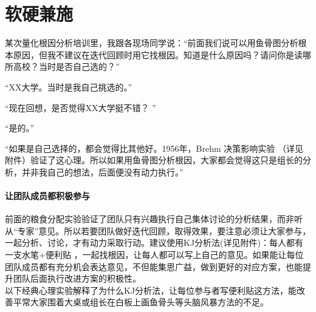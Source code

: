 \chapter{软硬兼施} %
某次量化根因分析培训里，我跟各现场同学说：“前面我们说可以用鱼骨图分析根本原因，但我不建议在迭代回顾时用它找根因。知道是什么原因吗？请问你是读哪所高校？当时是否自己选的？”

“XX大学。当时是我自己挑选的。”

“现在回想，是否觉得XX大学挺不错？ ”

“是的。”

“如果是自己选择的，都会觉得比其他好。1956年，Brehm 决策影响实验 （详见附件）验证了这心理。所以如果用鱼骨图分析根因，大家都会觉得这只是组长的分析，并非我自己的想法，后面便没有动力执行。”\\


\hypertarget{ux8ba9ux56e2ux961fux6210ux5458ux90fdux79efux6781ux53c2ux4e0e}{%
\subsubsection{让团队成员都积极参与}\label{ux8ba9ux56e2ux961fux6210ux5458ux90fdux79efux6781ux53c2ux4e0e}}

前面的粮食分配实验验证了团队只有兴趣执行自己集体讨论的分析结果，而非听从``专家''意见。所以若要团队做好迭代回顾，取得效果，要注意必须让大家参与，一起分析、讨论，才有动力采取行动。建议使用KJ分析法(详见附件)：每人都有一支水笔+便利贴
，一起找根因，让每人都可以写上自己的意见。如果能让每位团队成员都有充分机会表达意见，不但能集思广益，做到更好的对应方案，也能提升团队后面执行改进方案的积极性。\\
以下经典心理实验解释了为什么KJ分析法，让每位参与者写便利贴这方法，能改善平常大家围着大桌或组长在白板上画鱼骨头等头脑风暴方法的不足。\\

